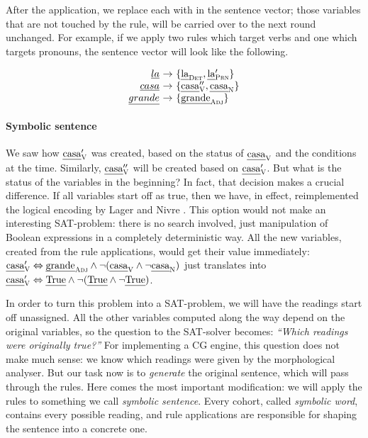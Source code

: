 \noindent After the application, we replace each \oldVar with \newVar in the sentence vector; those variables that are not touched by the rule, will be carried over to the next round unchanged. 
For example, if we apply two rules which target verbs and one which targets pronouns, 
the sentence vector will look like the following. 


$$\begin{array}{r @{~\rightarrow~} l}
\emph{la} & \{\laDet, \la{}'_\prn \} \\
\emph{casa} & \{\casa{}''_\v, \casaN \} \\
\emph{grande} & \{ \grandeAdj \} \\
\end{array}$$


\paragraph{Symbolic sentence}

We saw how $\text{\em casa}{}'_{\text{\sc V}}$ was created, based on the status of $\text{\em casa}_{\text{\sc V}}$ and the conditions at the time. Similarly, $\text{\em casa}{}''_{\text{\sc V}}$ will be created based on $\text{\em casa}{}'_{\text{\sc V}}$. 
But what is the status of the variables in the beginning?
In fact, that decision makes a crucial difference. 
If all variables start off as true, then we have, in effect, reimplemented the logical encoding by Lager and Nivre \cite{lager_nivre01}. 
This option would not make an interesting SAT-problem: 
there is no search involved, just manipulation of Boolean expressions in a completely deterministic way.
All the new variables, created from the rule applications, would get their value immediately: $\text{\em casa}{}'_{\text{\sc V}} \Leftrightarrow \text{\em grande}_{\text{\sc Adj}} \wedge \neg (\text{\em casa}_{\text{\sc V}} \wedge \neg \text{\em casa}_{\text{\sc N}})$ just translates into $\text{\em casa}{}'_{\text{\sc V}} \Leftrightarrow \text{\em True} \wedge \neg (\text{\em True} \wedge \neg \text{\em True})$. 



In order to turn this problem into a SAT-problem, we will have the readings start off
unassigned. All the other variables computed along the way depend on the original variables, so the question to the SAT-solver becomes: \emph{``Which readings were originally true?''}
For implementing a CG engine, this question does not make much sense: we know which readings were given by the morphological analyser. 
But our task now is to {\em generate} the original sentence, which will pass through the rules. 
Here comes the most important modification: we will apply the rules to something we call {\em symbolic sentence}. 
Every cohort, called {\em symbolic word}, contains every possible reading, and rule applications are responsible for shaping the sentence into a concrete one.

